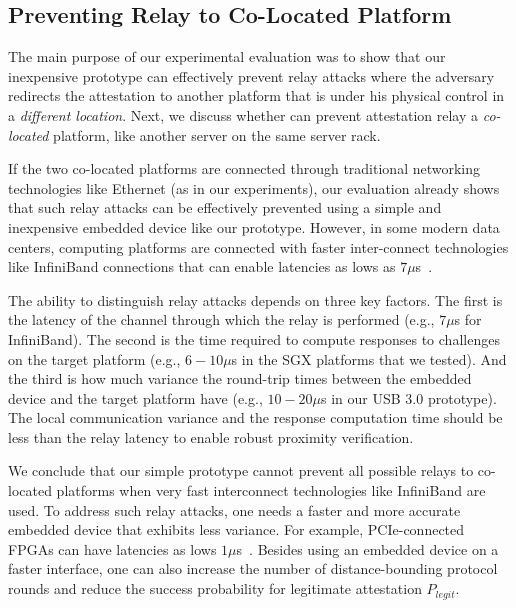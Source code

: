 \subsection{Preventing Relay to Co-Located Platform}
\label{sec:co-located}

The main purpose of our experimental evaluation was to show that our inexpensive \name prototype can effectively prevent relay attacks where the adversary redirects the attestation to another platform that is under his physical control in a \emph{different location}. Next, we discuss whether \name can prevent attestation relay a \emph{co-located} platform, like another server on the same server rack.

If the two co-located platforms are connected through traditional networking technologies like Ethernet (as in our experiments), our evaluation already shows that such relay attacks can be effectively prevented using a simple and inexpensive embedded device like our prototype. However, in some modern data centers, computing platforms are connected with faster inter-connect technologies like InfiniBand connections that can enable latencies as lows as $7 \mu$s~\cite{liu2003performance}. 

The ability to distinguish relay attacks depends on three key factors. The first is the latency of the channel through which the relay is performed (e.g., $7 \mu$s for InfiniBand). The second is the time required to compute responses to challenges on the target platform (e.g., $6-10 \mu$s in the SGX platforms that we tested). And the third is how much variance the round-trip times between the embedded device and the target platform have (e.g., $10-20 \mu$s in our USB 3.0 prototype). The local communication variance and the response computation time should be less than the relay latency to enable robust proximity verification. 

We conclude that our simple prototype cannot prevent all possible relays to co-located platforms when very fast interconnect technologies like InfiniBand are used. To address such relay attacks, one needs a faster and more accurate embedded device that exhibits less variance. For example, PCIe-connected FPGAs can have latencies as lows $1 \mu $s~\cite{algoLogic}. Besides using an embedded device on a faster interface, one can also increase the number of distance-bounding protocol rounds and reduce the success probability for legitimate attestation $P_{legit}$.


